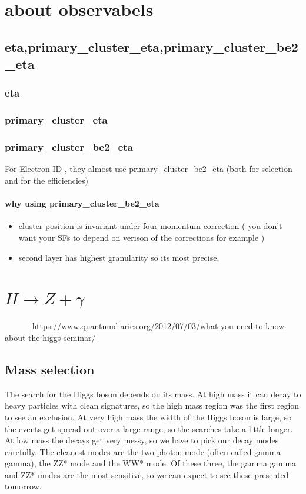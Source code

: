 \documentclass{ctexart}
\begin{document}
\section{about observabels}
\subsection{eta,primary\_cluster\_eta,primary\_cluster\_be2\_eta}
\subsubsection{eta}
\subsubsection{primary\_cluster\_eta}
\subsubsection{primary\_cluster\_be2\_eta}
For Electron ID , they almost use primary\_cluster\_be2\_eta (both for selection and for the efficiencies) 
\paragraph{why using primary\_cluster\_be2\_eta}
\begin{itemize}
    \item cluster position is invariant under four-momentum correction ( you don't want  your SFs to depend on verison of the corrections for example )
    \item second layer has highest granularity so its most precise.
    
\end{itemize}



\section{$H\rightarrow Z+\gamma$}      
\url{https://www.quantumdiaries.org/2012/07/03/what-you-need-to-know-about-the-higgs-seminar/}
\subsection{Mass selection}
The search for the Higgs boson depends on its mass. At high mass it can decay to heavy particles with clean signatures, so the high mass region was the first region to see an exclusion. At very high mass the width of the Higgs boson is large, so the events get spread out over a large range, so the searches take a little longer. At low mass the decays get very messy, so we have to pick our decay modes carefully. The cleanest modes are the two photon mode (often called gamma gamma), the ZZ* mode and the WW* mode. Of these three, the gamma gamma and ZZ* modes are the most sensitive, so we can expect to see these presented tomorrow.
\end{document}
